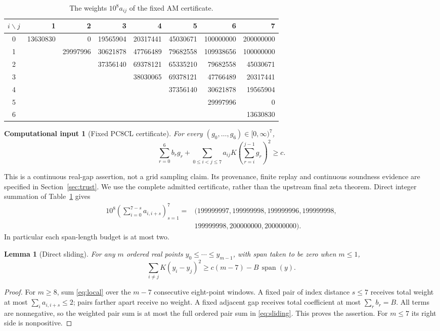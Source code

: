 \documentclass[11pt,a4paper]{article}
\newtheorem{lemma}[theorem]{Lemma}
\newtheorem{inputclaim}[theorem]{Computational input}
\theoremstyle{remark}
\begin{document}
\begin{table}[ht]
\centering\small
\begin{tabular}{c*{7}{r}}
\toprule
$i\backslash j$&1&2&3&4&5&6&7\\
\midrule
0&13630830&0&19565904&20317441&45030671&100000000&200000000\\
1&&29997996&30621878&47766489&79682558&109938656&100000000\\
2&&&37356140&69378121&65335210&79682558&45030671\\
3&&&&38030065&69378121&47766489&20317441\\
4&&&&&37356140&30621878&19565904\\
5&&&&&&29997996&0\\
6&&&&&&&13630830\\
\bottomrule
\end{tabular}
\caption{The weights $10^8a_{ij}$ of the fixed AM certificate.}
\label{tab:weights}
\end{table}

\begin{inputclaim}[Fixed PC8CL certificate]\label{in:pc8}
For every $(g_0,\ldots,g_6)\in[0,\infty)^7$,
\begin{equation}\label{eq:local}
 \sum_{r=0}^6b_rg_r+
 \sum_{0\le i<j\le7}a_{ij}
 K\left(\sum_{r=i}^{j-1}g_r\right)^2\ge c.
\end{equation}
\end{inputclaim}

This is a continuous real-gap assertion, not a grid sampling claim.
Its provenance, finite replay and continuous soundness evidence are
specified in Section~\ref{sec:trust}. We use the complete admitted
certificate, rather than the upstream final zeta theorem.
Direct integer summation of Table~\ref{tab:weights} gives
\begin{equation}\label{eq:capacity}
\begin{split}
10^8\left(\sum_{i=0}^{7-s}a_{i,i+s}\right)_{s=1}^7
={}&(199999997,199999998,199999996,199999998,\\
 &199999998,200000000,200000000).
\end{split}
\end{equation}
In particular each span-length budget is at most two.

\begin{lemma}[Direct sliding]\label{lem:sliding}
For any $m$ ordered real points $y_0\le\cdots\le y_{m-1}$,
with span taken to be zero when $m\le1$,
\begin{equation}\label{eq:sliding}
 \sum_{i\ne j}K(y_i-y_j)^2
 \ge c(m-7)-B\,\operatorname{span}(y).
\end{equation}
\end{lemma}
\begin{proof}
For $m\ge8$, sum \eqref{eq:local} over the $m-7$ consecutive
eight-point windows. A fixed pair of index distance $s\le7$ receives
total weight at most $\sum_i a_{i,i+s}\le2$; pairs farther apart
receive no weight. A fixed adjacent gap receives total coefficient
at most $\sum_rb_r=B$. All terms are nonnegative, so the weighted
pair sum is at most the full ordered pair sum in
\eqref{eq:sliding}. This proves the assertion. For $m\le7$ its
right side is nonpositive.
\end{proof}
\end{document}

